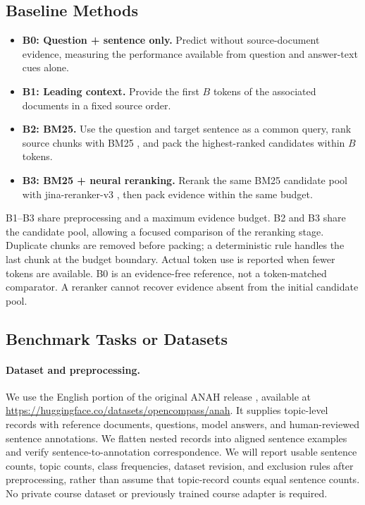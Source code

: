 \subsection{Baseline Methods}
\begin{itemize}
\item \textbf{B0: Question + sentence only.} Predict without source-document evidence, measuring the performance available from question and answer-text cues alone.
\item \textbf{B1: Leading context.} Provide the first $B$ tokens of the associated documents in a fixed source order.
\item \textbf{B2: BM25.} Use the question and target sentence as a common query, rank source chunks with BM25 \citep{robertson2009}, and pack the highest-ranked candidates within $B$ tokens.
\item \textbf{B3: BM25 + neural reranking.} Rerank the same BM25 candidate pool with jina-reranker-v3 \citep{wang2025jina}, then pack evidence within the same budget.
\end{itemize}
B1--B3 share preprocessing and a maximum evidence budget. B2 and B3 share the candidate pool, allowing a focused comparison of the reranking stage. Duplicate chunks are removed before packing; a deterministic rule handles the last chunk at the budget boundary. Actual token use is reported when fewer tokens are available. B0 is an evidence-free reference, not a token-matched comparator. A reranker cannot recover evidence absent from the initial candidate pool.

\subsection{Benchmark Tasks or Datasets}
\paragraph{Dataset and preprocessing.}
We use the English portion of the original ANAH release \citep{ji2024anah}, available at \url{https://huggingface.co/datasets/opencompass/anah}. It supplies topic-level records with reference documents, questions, model answers, and human-reviewed sentence annotations. We flatten nested records into aligned sentence examples and verify sentence-to-annotation correspondence. We will report usable sentence counts, topic counts, class frequencies, dataset revision, and exclusion rules after preprocessing, rather than assume that topic-record counts equal sentence counts. No private course dataset or previously trained course adapter is required.

